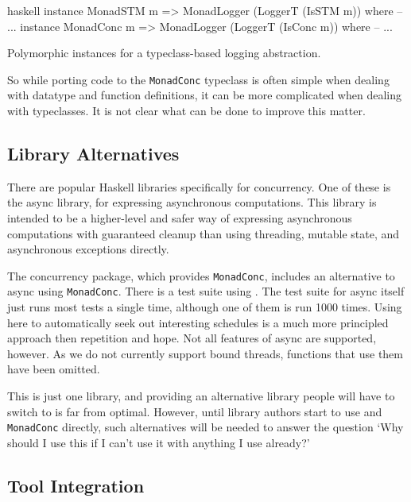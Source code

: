 \begin{listing}
\centering
\begin{cminted}{haskell}
instance MonadSTM  m => MonadLogger (LoggerT (IsSTM  m)) where -- ...
instance MonadConc m => MonadLogger (LoggerT (IsConc m)) where -- ...
\end{cminted}
\caption{Polymorphic instances for a typeclass-based logging abstraction.}\label{lst:mlogger3}
\end{listing}

So while porting code to the \verb|MonadConc| typeclass is often
simple when dealing with datatype and function definitions, it can be
more complicated when dealing with typeclasses.  It is not clear what
can be done to improve this matter.

\subsection{Library Alternatives}

There are popular Haskell libraries specifically for concurrency.  One
of these is the async\cite{async} library, for expressing asynchronous
computations.  This library is intended to be a higher-level and safer
way of expressing asynchronous computations with guaranteed cleanup
than using threading, mutable state, and asynchronous exceptions
directly.

The concurrency package, which provides \verb|MonadConc|, includes an
alternative to async using \verb|MonadConc|.  There is a test suite
using \dejafu{}.  The test suite for async itself just runs most tests
a single time, although one of them is run 1000 times.  Using
\dejafu{} here to automatically seek out interesting schedules is a
much more principled approach then repetition and hope.  Not all
features of async are supported, however.  As we do not currently
support bound threads, functions that use them have been omitted.

This is just one library, and providing an alternative library people
will have to switch to is far from optimal.  However, until library
authors start to use \dejafu{} and \verb|MonadConc| directly, such
alternatives will be needed to answer the question `Why should I use
this if I can't use it with anything I use already?'

\subsection{Tool Integration}

